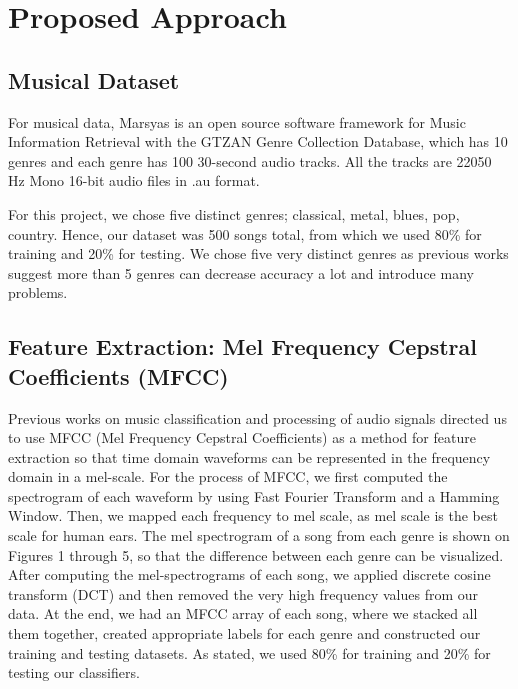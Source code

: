 \section{Proposed Approach}\label{sec:approach}
\subsection{Musical Dataset}
For musical data, Marsyas is an open source software framework for Music Information Retrieval with the GTZAN Genre Collection Database, which has 10 genres and each genre has 100 30-second audio tracks. All the tracks are 22050 Hz Mono 16-bit audio files in .au format. 

For this project, we chose five distinct genres; classical, metal, blues, pop, country. Hence, our dataset was 500 songs total, from which we used 80\% for training and 20\% for testing. We chose five very distinct genres as previous works \cite{Chun:2010} suggest more than 5 genres can decrease accuracy a lot and introduce many problems. 

\subsection{Feature Extraction: Mel Frequency Cepstral Coefficients (MFCC)}
Previous works \cite{MFCC:2011} on music classification and processing of audio signals directed us to use MFCC (Mel Frequency Cepstral Coefficients) as a method for feature extraction so that time domain waveforms can be represented in the frequency domain in a mel-scale. For the process of MFCC, we first computed the spectrogram of each waveform by using Fast Fourier Transform and a Hamming Window. Then, we mapped each frequency to mel scale, as mel scale is the best scale for human ears. The mel spectrogram of a song from each genre is shown on Figures 1 through 5, so that the difference between each genre can be visualized. After computing the mel-spectrograms of each song, we applied discrete cosine transform (DCT) and then removed the very high frequency values from our data. At the end, we had an MFCC array of each song, where we stacked all them together, created appropriate labels for each genre and constructed our training and testing datasets. As stated, we used 80\% for training and 20\% for testing our classifiers. 


